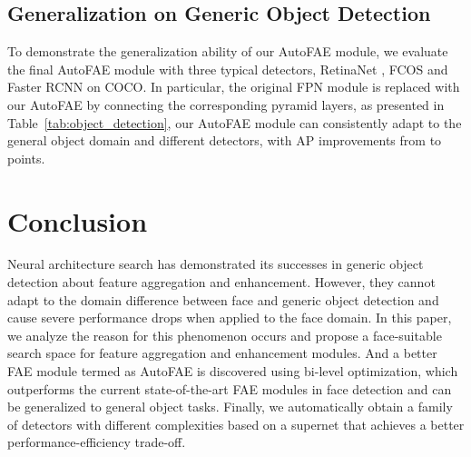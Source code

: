 \documentclass[sigconf]{acmart}
\begin{document}
\subsection{Generalization on Generic Object Detection}
To demonstrate the generalization ability of our AutoFAE module, we evaluate the final AutoFAE module with three typical detectors, RetinaNet \cite{lin2017focal}, FCOS \cite{tian2019fcos} and Faster RCNN \cite{ren2015faster} on COCO. In particular, the original FPN module is replaced with our AutoFAE by connecting the corresponding pyramid layers, as presented in Table~\ref{tab:object_detection}, our AutoFAE module can consistently adapt to the general object domain and different detectors, with AP improvements from  to  points.
\begin{table}[!t]
    \centering
    \caption{The generalization of AutoFAE on generic object detection dataset \textit{i.e.} COCO.}
    \label{tab:object_detection}
\end{table}


\section{Conclusion}
Neural architecture search has demonstrated its successes in generic object detection about feature aggregation and enhancement. However, they cannot adapt to the domain difference between face and generic object detection and cause severe performance drops when applied to the face domain. In this paper, we analyze the reason for this phenomenon occurs and propose a face-suitable search space for feature aggregation and enhancement modules. And a better FAE module termed as AutoFAE is discovered using bi-level optimization, which outperforms the current state-of-the-art FAE modules in face detection and can be generalized to general object tasks. Finally, we automatically obtain a family of detectors with different complexities based on a supernet that achieves a better performance-efficiency trade-off.


\balance

\end{document}
